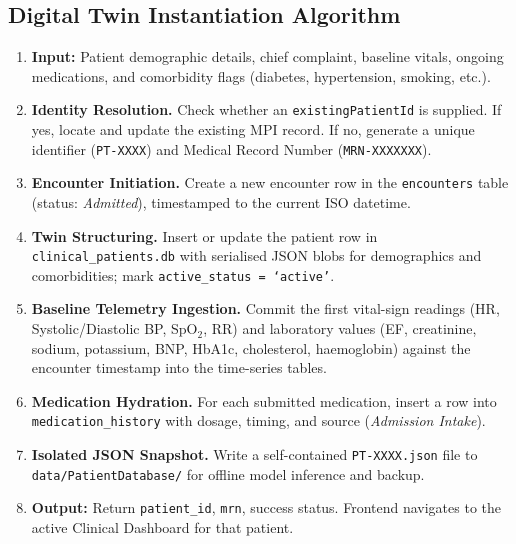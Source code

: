 \documentclass[12pt,a4paper]{article}
\begin{document}
\subsection{Digital Twin Instantiation Algorithm}
\begin{enumerate}[label=\textbf{Step \arabic*.}, leftmargin=*, itemsep=3pt]
  \item \textbf{Input:} Patient demographic details, chief complaint, baseline vitals,
        ongoing medications, and comorbidity flags (diabetes, hypertension, smoking, etc.).
  \item \textbf{Identity Resolution.}  Check whether an \texttt{existingPatientId} is
        supplied. If yes, locate and update the existing MPI record. If no, generate a
        unique identifier (\texttt{PT-XXXX}) and Medical Record Number (\texttt{MRN-XXXXXXX}).
  \item \textbf{Encounter Initiation.}  Create a new encounter row in the
        \texttt{encounters} table (status: \textit{Admitted}), timestamped to the
        current ISO datetime.
  \item \textbf{Twin Structuring.}  Insert or update the patient row in
        \texttt{clinical\_patients.db} with serialised JSON blobs for demographics and
        comorbidities; mark \texttt{active\_status = `active'}.
  \item \textbf{Baseline Telemetry Ingestion.}  Commit the first vital-sign readings
        (HR, Systolic/Diastolic BP, SpO$_2$, RR) and laboratory values (EF, creatinine,
        sodium, potassium, BNP, HbA1c, cholesterol, haemoglobin) against the encounter
        timestamp into the time-series tables.
  \item \textbf{Medication Hydration.}  For each submitted medication, insert a row
        into \texttt{medication\_history} with dosage, timing, and source
        (\textit{Admission Intake}).
  \item \textbf{Isolated JSON Snapshot.}  Write a self-contained
        \texttt{PT-XXXX.json} file to \texttt{data/PatientDatabase/} for offline model
        inference and backup.
  \item \textbf{Output:}  Return \texttt{patient\_id}, \texttt{mrn}, success status.
        Frontend navigates to the active Clinical Dashboard for that patient.
\end{enumerate}
\end{document}
